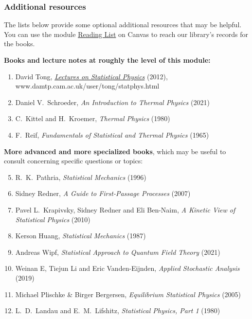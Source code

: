 \subsubsection*{Additional resources}
The lists below provide some optional additional resources that may be helpful.
You can use the module \href{https://liverpool.instructure.com/courses/47333/external_tools/102}{Reading List} on Canvas to reach our library's records for the books.

\noindent\textbf{Books and lecture notes at roughly the level of this module:} \\[-24 pt]
\begin{enumerate}
  \item David Tong, \href{https://www.damtp.cam.ac.uk/user/tong/statphys.html}{\textit{Lectures on Statistical Physics}} (2012), \\ www.damtp.cam.ac.uk/user/tong/statphys.html
  \item Daniel V.~Schroeder, \textit{An Introduction to Thermal Physics} (2021)
  \item C.~Kittel and H.~Kroemer, \textit{Thermal Physics} (1980)
  \item F.~Reif, \textit{Fundamentals of Statistical and Thermal Physics} (1965)
\end{enumerate}

\newpage %
\noindent\textbf{More advanced and more specialized books}, which may be useful to consult concerning specific questions or topics: \\[-24 pt]
\begin{enumerate}
  \setcounter{enumi}{4}
  \item R.~K.~Pathria, \textit{Statistical Mechanics} (1996)
  \item Sidney Redner, \textit{A Guide to First-Passage Processes} (2007)
  \item Pavel L.~Krapivsky, Sidney Redner and Eli Ben-Naim, \textit{A Kinetic View of Statistical Physics} (2010)
  \item Kerson Huang, \textit{Statistical Mechanics} (1987)
  \item Andreas Wipf, \textit{Statistical Approach to Quantum Field Theory} (2021)
  \item Weinan E, Tiejun Li and Eric Vanden-Eijnden, \textit{Applied Stochastic Analysis} (2019)
  \item Michael Plischke \& Birger Bergersen, \textit{Equilibrium Statistical Physics} (2005)
  \item L.~D.~Landau and E.~M.~Lifshitz, \textit{Statistical Physics, Part 1} (1980)
\end{enumerate}

